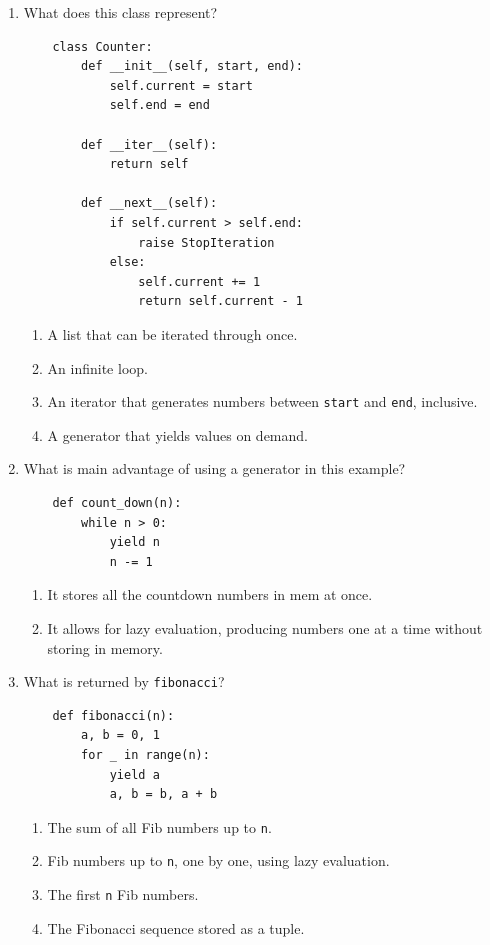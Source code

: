 \documentclass[oneside,11pt,dvipsnames]{book}
\begin{document}
\begin{enumerate}
\item What does this class represent?
\begin{lstlisting}
    class Counter:
        def __init__(self, start, end):
            self.current = start
            self.end = end
    
        def __iter__(self):
            return self
    
        def __next__(self):
            if self.current > self.end:
                raise StopIteration
            else:
                self.current += 1
                return self.current - 1
    \end{lstlisting}
\begin{enumerate}
    \item A list that can be iterated through once.
    \item An infinite loop.
    \item An iterator that generates numbers between \texttt{start} and \texttt{end}, inclusive.
    \item A generator that yields values on demand.
\end{enumerate}




\item What is main advantage of using a generator in this example?
\begin{lstlisting}
    def count_down(n):
        while n > 0:
            yield n
            n -= 1
    \end{lstlisting}

\begin{enumerate}
    \item It stores all the countdown numbers in mem at once.
    \item It allows for lazy evaluation, producing numbers one at a time without storing in memory.
\end{enumerate}


\item What is returned by \texttt{fibonacci}?

\begin{lstlisting}
    def fibonacci(n):
        a, b = 0, 1
        for _ in range(n):
            yield a
            a, b = b, a + b
\end{lstlisting}

\begin{enumerate}
    \item The sum of all Fib numbers up to \texttt{n}.
    \item Fib numbers up to \texttt{n}, one by one, using lazy evaluation.
    \item The first \texttt{n} Fib numbers.
    \item The Fibonacci sequence stored as a tuple.
\end{enumerate}


\end{enumerate}
\end{document}

